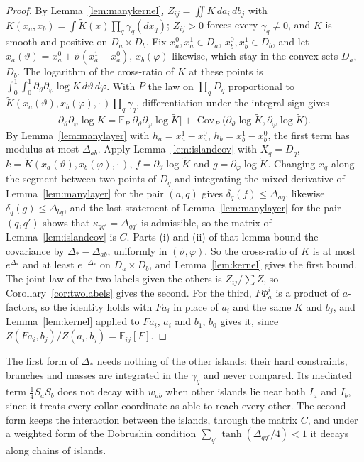 \documentclass[11pt]{amsart}
\theoremstyle{definition}
\theoremstyle{remark}
\numberwithin{equation}{section}
\newcommand{\E}{\mathbb{E}}
\newcommand{\Cov}{\operatorname{Cov}}
\begin{document}
\begin{proof}
By Lemma~\ref{lem:manykernel}, $Z_{ij}=\iint K\,da_i\,db_j$ with $K(x_a,x_b)
=\int\tilde K(x)\prod_q\gamma_q(dx_q)$; $Z_{ij}>0$ forces every
$\gamma_q\ne0$, and $K$ is smooth and positive on $D_a\times D_b$. Fix
$x_a^0,x_a^1\in D_a$, $x_b^0,x_b^1\in D_b$, and let $x_a(\vartheta)=x_a^0+
\vartheta(x_a^1-x_a^0)$, $x_b(\varphi)$ likewise, which stay in the convex
sets $D_a$, $D_b$. The logarithm of the cross-ratio of $K$ at these points
is $\int_0^1\!\int_0^1\partial_\vartheta\partial_\varphi\log K\,d\vartheta\,
d\varphi$. With $P$ the law on $\prod_qD_q$ proportional to $\tilde K(x_a
(\vartheta),x_b(\varphi),\cdot\,)\prod_q\gamma_q$, differentiation under
the integral sign gives
\[
\partial_\vartheta\partial_\varphi\log K=\E_P\bigl[\partial_\vartheta
\partial_\varphi\log\tilde K\bigr]+\Cov_P\bigl(\partial_\vartheta\log
\tilde K,\partial_\varphi\log\tilde K\bigr).
\]
By Lemma~\ref{lem:manylayer} with $h_a=x_a^1-x_a^0$, $h_b=x_b^1-x_b^0$, the
first term has modulus at most $\varDelta_{ab}$. Apply
Lemma~\ref{lem:islandcov} with $X_q=D_q$, $k=\tilde K(x_a(\vartheta),
x_b(\varphi),\cdot\,)$, $f=\partial_\vartheta\log\tilde K$ and $g=
\partial_\varphi\log\tilde K$. Changing $x_q$ along the segment between two
points of $D_q$ and integrating the mixed derivative of
Lemma~\ref{lem:manylayer} for the pair $(a,q)$ gives $\delta_q(f)\le
\varDelta_{aq}$, likewise $\delta_q(g)\le\varDelta_{bq}$, and the last
statement of Lemma~\ref{lem:manylayer} for the pair $(q,q')$ shows that
$\kappa_{qq'}=\varDelta_{qq'}$ is admissible, so the matrix of
Lemma~\ref{lem:islandcov} is $C$. Parts (i) and (ii) of that lemma bound the covariance by
$\varDelta_*-\varDelta_{ab}$, uniformly in $(\vartheta,\varphi)$. So the
cross-ratio of $K$ is at most $e^{\varDelta_*}$ and at least
$e^{-\varDelta_*}$ on $D_a\times D_b$, and Lemma~\ref{lem:kernel} gives the
first bound. The joint law of the two labels given the others is
$Z_{ij}/\sum Z$, so Corollary~\ref{cor:twolabels} gives the second. For the
third, $F\Phi_a^i$ is a product of $a$-factors, so the identity holds with
$Fa_i$ in place of $a_i$ and the same $K$ and $b_j$, and
Lemma~\ref{lem:kernel} applied to $Fa_i$, $a_i$ and $b_1$, $b_0$ gives it,
since $Z(Fa_i,b_j)/Z(a_i,b_j)=\E_{ij}[F]$.
\end{proof}

The first form of $\varDelta_*$ needs nothing of the other islands: their
hard constraints, branches and masses are integrated in the $\gamma_q$ and
never compared. Its mediated term $\frac14S_aS_b$ does not decay with
$w_{ab}$ when other islands lie near both $I_a$ and $I_b$, since it treats
every collar coordinate as able to reach every other. The second form
keeps the interaction between the islands, through the matrix $C$, and
under a weighted form of the Dobrushin condition
$\sum_{q'}\tanh(\varDelta_{qq'}/4)<1$ it decays along chains of islands.
\end{document}
